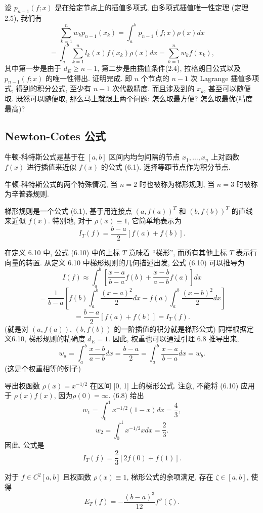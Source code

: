 \documentclass[a4paper]{ctexart}
\newcommand{\hl}[1]
{\noindent {\bf {#1}}}
\begin{document}
{\hl{证明} 设 $p_{n-1}(f; x)$ 是在给定节点上的插值多项式, 由多项式插值唯一性定理 (定理2.5), 我们有
\[ 
\sum_{k = 1}^{n} w_k p_{n-1}(x_k) = \int_{a}^{b} p_{n-1}(f; x) \rho(x) dx 
\]
\[ 
= \int_{a}^{b} \sum_{k=1}^{n} l_k(x) f(x_k) \rho(x) dx = \sum_{k=1}^{n} w_k f(x_k), 
\]
其中第一步是由于 $d_E \geq n - 1$, 第二步是由插值条件(2.4), 拉格朗日公式以及 $p_{n-1}(f; x)$ 的唯一性得出. 
证明完成. 即 $n$ 个节点的 $n - 1$ 次 Lagrange 插值多项式, 得到的积分公式, 至少有 $n - 1$ 次代数精度. 
而且涉及到的 $x_k$, 甚至可以随便取. 既然可以随便取, 那么马上就跟上两个问题: 怎么取最方便? 怎么取最优(精度最高)? 

\subsection{Newton-Cotes 公式}

\hl{定义6.9} 牛顿-科特斯公式是基于在 $[a, b]$ 区间内均匀间隔的节点 
$x_1, \ldots, x_n$ 上对函数 $f(x)$ 进行插值来近似 $f(x)$ 的公式 (6.1).
选择等距节点作为积分节点. 

牛顿-科特斯公式的两个特殊情况, 当 $n = 2$ 时也被称为梯形规则, 当 $n = 3$ 时被称为辛普森规则.

\hl{定义6.10} 梯形规则是一个公式 (6.1), 基于用连接点 $(a, f(a))^T$ 和 $(b, f(b))^T$ 
的直线来近似 $f(x)$. 特别地, 对于 $\rho(x) \equiv 1$, 它简单地表示为
\[ 
I_T(f) = \frac{b - a}{2} [f(a) + f(b)]. 
\]

在定义 6.10 中, 公式 (6.10) 中的上标 $T$ 意味着 ``梯形'', 
而所有其他上标 $T$ 表示行向量的转置. 从定义 6.10 中梯形规则的几何描述出发, 公式 (6.10) 可以推导为
\[ 
I(f) \approx \int_{a}^{b} \left[ \frac{x - a}{b - a} f(b) + \frac{x - b}{a - b} f(a) \right] dx 
\]
\[ 
= \frac{1}{b - a} 
\left[ f(b) \int_{a}^{b} \frac{(x - a)^2}{2} dx - f(a) \int_{a}^{b} \frac{(x - b)^2}{2} dx \right] 
\]
\[ 
= \frac{b - a}{2} [f(a) + f(b)] = I_T(f). 
\]
(就是对 $(a, f(a))$, $(b, f(b))$ 的一阶插值的积分就是梯形公式)
同样根据定义6.10, 梯形规则的精确度 $d_E = 1$. 因此, 权重也可以通过引理 6.8 推导出来,
\[ 
w_a = \int_{a}^{b} \frac{x - b}{a - b} dx 
= \frac{b - a}{2} = \int_{a}^{b} \frac{x - a}{b - a} dx = w_b. 
\]
(这是个权重相等的例子)

\hl{例6.11} 导出权函数 $\rho(x) = x^{-1/2}$ 在区间 [0, 1]
上的梯形公式. 注意, 不能将 (6.10) 应用于 $\rho(x)f(x)$, 
因为$\rho(0) = \infty$. (6.8) 给出
\[ 
w_1 = \int_{0}^{1} x^{-1/2} (1 - x) dx = \frac{4}{3}, 
\]
\[ 
w_2 = \int_{0}^{1} x^{-1/2} x dx = \frac{2}{3}. 
\]
因此, 公式是
\[ 
I_T(f) = \frac{2}{3} [2f(0) + f(1)]. 
\] 

\hl{定理6.12} 对于 $f \in C^2[a, b]$ 且权函数 $\rho(x) \equiv 1$,
梯形公式的余项满足, 存在 $\zeta \in [a, b]$, 使得
\[ 
E_T(f) = -\frac{(b - a)^3}{12} f''(\zeta). 
\] 

}
\end{document}
